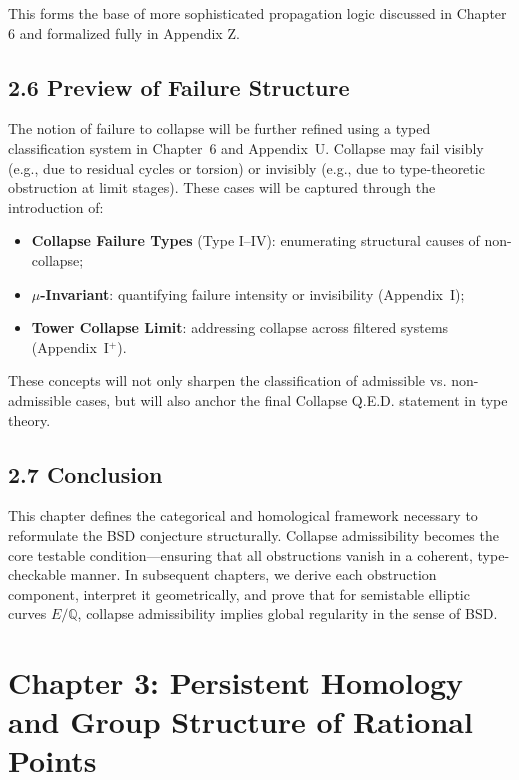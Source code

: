 \documentclass[11pt]{article}
\begin{document}
This forms the base of more sophisticated propagation logic discussed in Chapter 6 and formalized fully in Appendix Z.

\subsection*{2.6 Preview of Failure Structure}

The notion of failure to collapse will be further refined using a typed classification system in Chapter~6 and Appendix~U. Collapse may fail visibly (e.g., due to residual cycles or torsion) or invisibly (e.g., due to type-theoretic obstruction at limit stages). These cases will be captured through the introduction of:

\begin{itemize}
  \item \textbf{Collapse Failure Types} (Type I–IV): enumerating structural causes of non-collapse;
  \item \textbf{\(\mu\)-Invariant}: quantifying failure intensity or invisibility (Appendix~I);
  \item \textbf{Tower Collapse Limit}: addressing collapse across filtered systems (Appendix~I$^+$).
\end{itemize}

These concepts will not only sharpen the classification of admissible vs. non-admissible cases, but will also anchor the final Collapse Q.E.D. statement in type theory.

\subsection*{2.7 Conclusion}

This chapter defines the categorical and homological framework necessary to reformulate the BSD conjecture structurally. Collapse admissibility becomes the core testable condition—ensuring that all obstructions vanish in a coherent, type-checkable manner. In subsequent chapters, we derive each obstruction component, interpret it geometrically, and prove that for semistable elliptic curves \( E/\mathbb{Q} \), collapse admissibility implies global regularity in the sense of BSD.



\section{Chapter 3: Persistent Homology and Group Structure of Rational Points}
\label{sec:ph1-mw-group}
\end{document}
